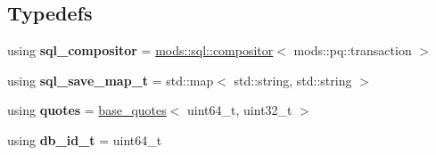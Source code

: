 \subsection*{Typedefs}
\begin{DoxyCompactItemize}
\item 
\mbox{\label{namespacemods_1_1orm_a9c7edd00f6865764b90bea5b967e4e5b}} 
using {\bfseries sql\+\_\+compositor} = \hyperlink{structmods_1_1sql_1_1compositor}{mods\+::sql\+::compositor}$<$ mods\+::pq\+::transaction $>$
\item 
\mbox{\label{namespacemods_1_1orm_a71a7d1e51fef4ad2c051065c27d09e4f}} 
using {\bfseries sql\+\_\+save\+\_\+map\+\_\+t} = std\+::map$<$ std\+::string, std\+::string $>$
\item 
\mbox{\label{namespacemods_1_1orm_a844bf26414ceb7427f56f4ad763288fb}} 
using {\bfseries quotes} = \hyperlink{structmods_1_1orm_1_1base__quotes}{base\+\_\+quotes}$<$ uint64\+\_\+t, uint32\+\_\+t $>$
\item 
\mbox{\label{namespacemods_1_1orm_a384d6923bfbb888aa4b1860ceb305c01}} 
using {\bfseries db\+\_\+id\+\_\+t} = uint64\+\_\+t
\end{DoxyCompactItemize}
